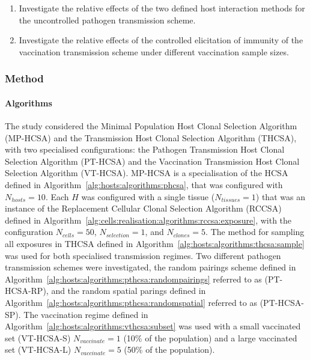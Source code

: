 \begin{enumerate}
	\item Investigate the relative effects of the two defined host interaction methods for the uncontrolled pathogen transmission scheme. 
	\item Investigate the relative effects of the controlled elicitation of immunity of the vaccination transmission scheme under different vaccination sample sizes.
\end{enumerate}


%
%
\subsubsection{Method}

%
%
\paragraph{Algorithms}
The study considered the Minimal Population Host Clonal Selection Algorithm (MP-HCSA) and the Transmission Host Clonal Selection Algorithm (THCSA), with two specialised configurations: the Pathogen Transmission Host Clonal Selection Algorithm (PT-HCSA) and the Vaccination Transmission Host Clonal Selection Algorithm (VT-HCSA).
MP-HCSA is a specialisation of the HCSA defined in Algorithm~\ref{alg:hosts:algorithms:phcsa}, that was configured with $N_{hosts}=10$. Each $H$ was configured with a single tissue ($N_{tissues}=1$) that was an instance of the Replacement Cellular Clonal Selection Algorithm (RCCSA) defined in Algorithm~\ref{alg:cells:realisation:algorithms:rccsa:exposure}, with the configuration $N_{cells}=50$, $N_{selection}=1$, and $N_{clones}=5$.
The method for sampling all exposures in THCSA defined in Algorithm~\ref{alg:hosts:algorithms:thcsa:sample} was used for both specialised transmission regimes. 
Two different pathogen transmission schemes were investigated, the random pairings scheme defined in Algorithm~\ref{alg:hosts:algorithms:pthcsa:randompairings} referred to as (PT-HCSA-RP), and the random spatial parings defined in Algorithm~\ref{alg:hosts:algorithms:pthcsa:randomspatial} referred to as (PT-HCSA-SP).
The vaccination regime defined in Algorithm~\ref{alg:hosts:algorithms:vthcsa:subset} was used with a small vaccinated set (VT-HCSA-S) $N_{vaccinate}=1$ (10\% of the population) and a large vaccinated set (VT-HCSA-L) $N_{vaccinate}=5$ (50\% of the population).

%
%
